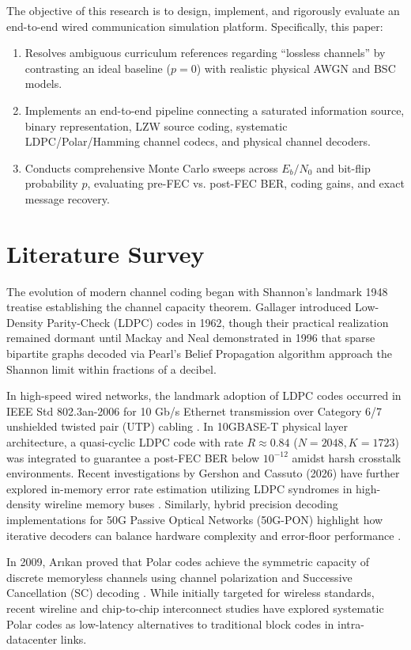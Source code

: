 \documentclass[conference]{IEEEtran}
\begin{document}
The objective of this research is to design, implement, and rigorously evaluate an end-to-end wired communication simulation platform. Specifically, this paper:
\begin{enumerate}
    \item Resolves ambiguous curriculum references regarding ``lossless channels'' by contrasting an ideal baseline ($p=0$) with realistic physical AWGN and BSC models.
    \item Implements an end-to-end pipeline connecting a saturated information source, binary representation, LZW source coding, systematic LDPC/Polar/Hamming channel codecs, and physical channel decoders.
    \item Conducts comprehensive Monte Carlo sweeps across $E_b/N_0$ and bit-flip probability $p$, evaluating pre-FEC vs. post-FEC BER, coding gains, and exact message recovery.
\end{enumerate}

\section{Literature Survey}
The evolution of modern channel coding began with Shannon's landmark 1948 treatise establishing the channel capacity theorem. Gallager introduced Low-Density Parity-Check (LDPC) codes in 1962, though their practical realization remained dormant until Mackay and Neal demonstrated in 1996 that sparse bipartite graphs decoded via Pearl's Belief Propagation algorithm approach the Shannon limit within fractions of a decibel.

In high-speed wired networks, the landmark adoption of LDPC codes occurred in IEEE Std 802.3an-2006 for 10 Gb/s Ethernet transmission over Category 6/7 unshielded twisted pair (UTP) cabling \cite{ieee8023an}. In 10GBASE-T physical layer architecture, a quasi-cyclic LDPC code with rate $R \approx 0.84$ ($N=2048, K=1723$) was integrated to guarantee a post-FEC BER below $10^{-12}$ amidst harsh crosstalk environments. Recent investigations by Gershon and Cassuto (2026) have further explored in-memory error rate estimation utilizing LDPC syndromes in high-density wireline memory buses \cite{gershon2026}. Similarly, hybrid precision decoding implementations for 50G Passive Optical Networks (50G-PON) highlight how iterative decoders can balance hardware complexity and error-floor performance \cite{optica2024}.

In 2009, Ar{\i}kan proved that Polar codes achieve the symmetric capacity of discrete memoryless channels using channel polarization and Successive Cancellation (SC) decoding \cite{arikan2009}. While initially targeted for wireless standards, recent wireline and chip-to-chip interconnect studies have explored systematic Polar codes as low-latency alternatives to traditional block codes in intra-datacenter links.
\end{document}
